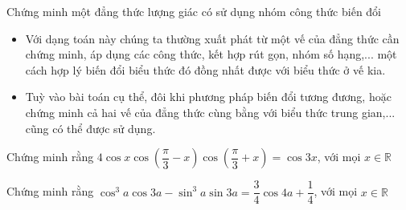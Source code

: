 \begin{dang}{Chứng minh một đẳng thức lượng giác có sử dụng nhóm công thức biến đổi}
	\begin{itemize}
		\item Với dạng toán này chúng ta thường xuất phát từ một vế của đẳng thức cần chứng minh, áp dụng các công thức, kết hợp rút gọn, nhóm số hạng,... một cách hợp lý biến đổi biểu thức đó đồng nhất được với biểu thức ở vế kia.
		\item Tuỳ vào bài toán cụ thể, đôi khi phương pháp biến đổi tương đương, hoặc chứng minh cả hai vế của đẳng thức cùng bằng với biểu thức trung gian,... cũng có thể được sử dụng.
	\end{itemize}
\end{dang}
\begin{vd}%
	Chứng minh rằng $4\cos x\cos \left(\dfrac{\pi}{3}-x\right)\cos \left(\dfrac{\pi}{3}+x\right)=\cos 3x$, với mọi $x \in \mathbb{R}$
\end{vd}
\begin{vd}%
	Chứng minh rằng $\cos^3a\cos 3a-\sin^3a\sin 3a=\dfrac{3}{4}\cos 4a+\dfrac{1}{4}$, với mọi $x \in \mathbb{R}$
\end{vd}
